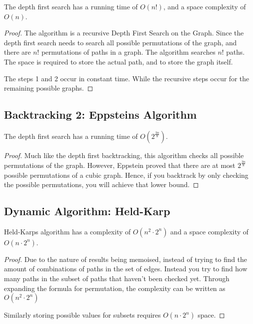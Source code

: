 \begin{lemma}
    The depth first search has a running time of $O(n!)$, and a space complexity
    of $O(n)$.
\end{lemma}

\begin{proof}
    The algorithm is a recursive Depth First Search on the Graph. Since the
    depth first search needs to search all possible permutations of the graph,
    and there are $n!$ permutations of paths in a graph. The algorithm searches
    $n!$ paths. The space is required to store the actual path, and to store the
    graph itself.

    The steps 1 and 2 occur in constant time. While the recursive steps occur
    for the remaining possible graphs.
\end{proof}

\subsection{Backtracking 2: Eppsteins Algorithm}

\begin{lemma}
    The depth first search has a running time of $O(2^{\frac{3n}{8}})$.
\end{lemma}

\begin{proof}
    Much like the depth first backtracking, this algorithm checks all possible
    permutations of the graph. However, Eppstein proved that there are at most
    $2^{\frac{3n}{8}}$ possible permutations of a cubic graph. Hence, if you
    backtrack by only checking the possible permutations, you will achieve that
    lower bound.
\end{proof}

\subsection{Dynamic Algorithm: Held-Karp}

\begin{lemma}
    Held-Karps algorithm has a complexity of $O(n^2 \cdot 2^n)$ and a space
    complexity of $O(n\cdot2^n)$.
\end{lemma}

\begin{proof}
    Due to the nature of results being memoised, instead of trying to find the
    amount of combinations of paths in the set of edges. Instead you try to find
    how many paths in the subset of paths that haven't been checked yet. Through
    expanding the formula for permutation, the complexity can be written as
    $O(n^2\cdot2^n)$

    Similarly storing possible values for subsets requires $O(n \cdot 2^n)$
    space.
\end{proof}

